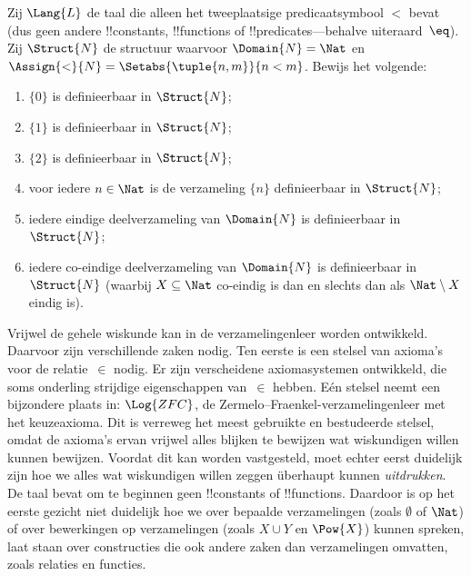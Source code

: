 \documentclass[openany]{memoir}
\begin{document}
\begin{prob}
Zij $\Lang{L}$ de taal die alleen het tweeplaatsige predicaatsymbool
$<$ bevat (dus geen andere !!{constant}s, !!{function}s of
!!{predicate}s---behalve uiteraard~$\eq$). Zij $\Struct{N}$ de
structuur waarvoor $\Domain{N} = \Nat$ en
$\Assign{<}{N} = \Setabs{\tuple{n,m}}{n < m}$. Bewijs het volgende:
\begin{enumerate}
\item $\{ 0 \}$ is definieerbaar in $\Struct{N}$;
\item $\{ 1 \}$ is definieerbaar in $\Struct{N}$;
\item $\{ 2 \}$ is definieerbaar in $\Struct{N}$;
\item voor iedere $n \in \Nat$ is de verzameling $\{ n \}$
  definieerbaar in $\Struct{N}$;
\item iedere eindige deelverzameling van $\Domain{N}$ is definieerbaar
  in $\Struct{N}$;
\item iedere co-eindige deelverzameling van $\Domain{N}$ is
  definieerbaar in $\Struct{N}$ (waarbij $X \subseteq \Nat$
  co-eindig is dan en slechts dan als $\Nat \setminus X$ eindig is).
\end{enumerate}
\end{prob}
\endgroup

\begingroup
\def\olfilename{OLP-0172}
\def\olfilepath{content/first-order-logic/models-theories/}
\hypertarget{unit-OLP-0172}{}





Vrijwel de gehele wiskunde kan in de verzamelingenleer worden
ontwikkeld. Daarvoor zijn verschillende zaken nodig. Ten eerste is een
stelsel van axioma's voor de relatie~$\in$ nodig. Er zijn verscheidene
axiomasystemen ontwikkeld, die soms onderling strijdige eigenschappen
van~$\in$ hebben. Eén stelsel neemt een bijzondere plaats in:
$\Log{ZFC}$, de Zermelo--Fraenkel-verzamelingenleer met het keuzeaxioma.
Dit is verreweg het meest gebruikte en bestudeerde stelsel, omdat de
axioma's ervan vrijwel alles blijken te bewijzen wat wiskundigen willen
kunnen bewijzen. Voordat dit kan worden vastgesteld, moet echter eerst
duidelijk zijn hoe we alles wat wiskundigen willen zeggen überhaupt
kunnen \emph{uitdrukken}. De taal bevat om te beginnen geen
!!{constant}s of !!{function}s. Daardoor is op het eerste gezicht niet
duidelijk hoe we over bepaalde verzamelingen (zoals $\emptyset$ of
$\Nat$) of over bewerkingen op verzamelingen (zoals $X \cup Y$ en
$\Pow{X}$) kunnen spreken, laat staan over constructies die ook andere
zaken dan verzamelingen omvatten, zoals relaties en functies.
\end{document}
